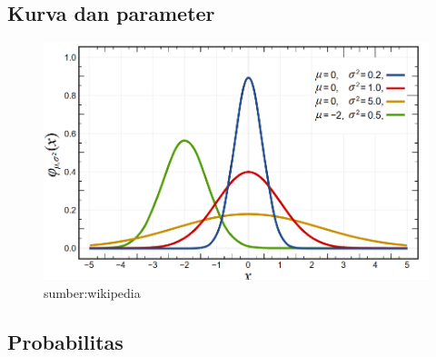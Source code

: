\documentclass[
  letterpaper,
  DIV=11,
  numbers=noendperiod]{scrartcl}
\begin{document}
\hypertarget{kurva-dan-parameter}{%
\subsection{Kurva dan parameter}\label{kurva-dan-parameter}}

\begin{figure}

{\centering \includegraphics{normal.png}

}

\caption{sumber:wikipedia}

\end{figure}

\hypertarget{probabilitas}{%
\subsection{Probabilitas}\label{probabilitas}}
\end{document}
